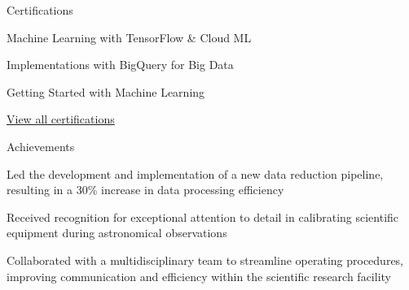 \documentclass{resume} %
\begin{document}
    \begin{rSection}{Certifications}
        \begin{rSubsection}{}{}{}
                            \item Machine Learning with TensorFlow \& Cloud ML
                            \item Implementations with BigQuery for Big Data
                            \item Getting Started with Machine Learning
                    \end{rSubsection}
        \href{https://skillsoft.digitalbadges.skillsoft.com/profile/umairsaeed185770/wallet}{View all certifications}
    \end{rSection}

    \begin{rSection}{Achievements}
        \begin{rSubsection}{}{}{}
                            \item Led the development and implementation of a new data reduction pipeline, resulting in a 30\% increase in data processing efficiency
                            \item Received recognition for exceptional attention to detail in calibrating scientific equipment during astronomical observations
                            \item Collaborated with a multidisciplinary team to streamline operating procedures, improving communication and efficiency within the scientific research facility
                    \end{rSubsection}
    \end{rSection}
\end{document}
